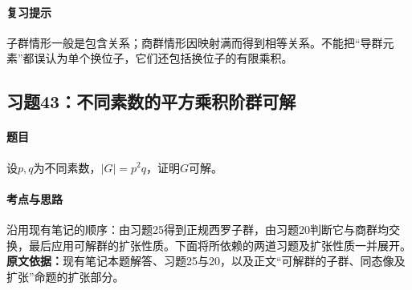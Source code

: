 \paragraph{复习提示}子群情形一般是包含关系；商群情形因映射满而得到相等关系。不能把“导群元素”都误认为单个换位子，它们还包括换位子的有限乘积。

\subsection{习题43：不同素数的平方乘积阶群可解}
\paragraph{题目}设$p,q$为不同素数，$|G|=p^2q$，证明$G$可解。
\paragraph{考点与思路}沿用现有笔记的顺序：由习题25得到正规西罗子群，由习题20判断它与商群均交换，最后应用可解群的扩张性质。下面将所依赖的两道习题及扩张性质一并展开。
\textbf{原文依据：}现有笔记本题解答、习题25与20，以及正文“可解群的子群、同态像及扩张”命题的扩张部分。
